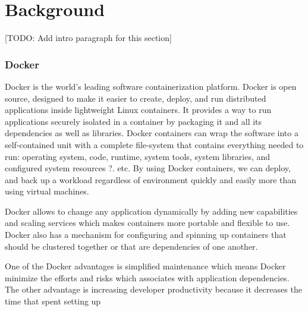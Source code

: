 \documentclass[conference]{IEEEtran}
\begin{document}

% 

%
%

\section{Background}
[TODO: Add intro paragraph for this section]\\

\subsubsection{Docker}
Docker is the world's leading software containerization platform. Docker is open source, designed to make it easier to create, deploy, and run distributed applications inside lightweight Linux containers. It provides a way to run applications securely isolated in a container by packaging it and all its dependencies as well as libraries. Docker containers can wrap the software into a self-contained unit with a complete file-system that contains everything needed to run: operating system, code, runtime, system tools, system libraries, and configured system resources ?. etc. By using Docker containers, we can deploy, and back up a workload regardless of environment quickly and easily more than using virtual machines.

Docker allows to change any application dynamically by adding new capabilities and scaling services which makes containers more portable and flexible to use. Docker also has a mechanism for configuring and spinning up containers that should be clustered together or that are dependencies of one another.

One of the Docker advantages is simplified maintenance which means Docker minimize the efforts and risks which associates with application dependencies. The other advantage is increasing developer productivity because it decreases the time that spent setting up 
\end{document}

